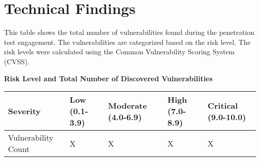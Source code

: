 \section{Technical Findings}
\label{sec:tech}
This table shows the total number of vulnerabilities found during the penetration test engagement. The vulnerabilities are categorized based on the risk level. The risk levels were calculated using the Common Vulnerability Scoring System (CVSS).

\begin{center}
\textbf{Risk Level and Total Number of Discovered Vulnerabilities}
\end{center}

\setlength\arrayrulewidth{1.25pt}

\begin{table}[h]
\renewcommand{\arraystretch}{2}
    \centering
    \begin{tabular}{|>{\large}p{11em}|>{\large}p{5em}|>{\large}p{5em}|>{\large}p{5em}|>{\large}p{6em}|}\hline
         Severity & \cellcolor{green}Low \newline (0.1-3.9) & \cellcolor{yellow}Moderate (4.0-6.9) & \cellcolor{orange}High (7.0-8.9) & \cellcolor{red}Critical (9.0-10.0)\\\hline
        Vulnerability Count& X & X & X & X \\\hline
    \end{tabular}
\end{table}

